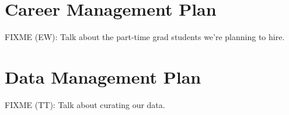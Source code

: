 \documentclass[11pt]{article}
\newcommand{\fixme}[2]{FIXME (#1): {#2}}
\begin{document}
\section{Career Management Plan}

\fixme{EW}{Talk about the part-time grad students we're planning to hire.}

\section{Data Management Plan}

\fixme{TT}{Talk about curating our data.}
\end{document}
